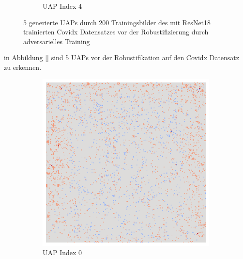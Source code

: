 \begin{figure}[ht!]
\begin{subfigure}{0.19\linewidth}
        \caption{UAP Index 4}
    \end{subfigure}
    \caption{5 generierte UAPs durch 200 Trainingsbilder des mit ResNet18 trainierten Covidx Datensatzes vor der Robustifizierung durch adversarielles Training}
    \label{fig:uap-resnet18-covidx-rob0}
\end{figure}

in Abbildung \ref{} sind 5 UAPs vor der Robustifikation auf den Covidx Datensatz zu erkennen. 

\begin{figure}[ht!]
    \centering
    \begin{subfigure}{0.19\linewidth}
        \centering
        \includegraphics[height=1\linewidth]{01-images/05-resultate/uap_resnet/uap0-resnet18-mri-n200-robustificationslevel0.png}
        \caption{UAP Index 0}
    \end{subfigure}\hfill%
    \begin{subfigure}{0.19\linewidth}
        \centering

\end{subfigure}
\end{figure}

